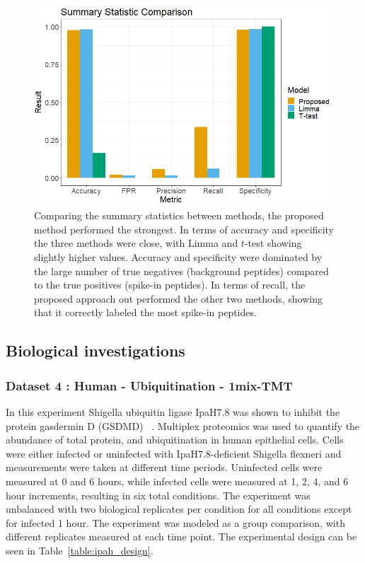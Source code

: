 \documentclass{mcp}
\begin{document}
\begin{figure}[h!]
\centering
\includegraphics[width=.85\textwidth]{sim_new/spike_in_statistic_comparison}
\caption{Comparing the summary statistics between methods, the proposed method performed the strongest. In terms of accuracy and specificity the three methods were close, with Limma and $t$-test showing slightly higher values. Accuracy and specificity were dominated by the large number of true negatives (background peptides) compared to the true positives (spike-in peptides). In terms of recall, the proposed approach out performed the other two methods, showing that it correctly labeled the most spike-in peptides. \label{fig:spike_stat}}
\end{figure}

\clearpage
\subsection{Biological investigations}
\label{sec:bio_investigations}

\subsubsection{Dataset 4 : Human - Ubiquitination - 1mix-TMT}
\label{sec:ipah}

In this experiment Shigella ubiquitin ligase IpaH7.8 was shown to inhibit the protein gasdermin D (GSDMD) ~\cite{LUCHETTI2021}. Multiplex proteomics was used to quantify the abundance of total protein, and ubiquitination in human epithelial cells. Cells were either infected or uninfected with IpaH7.8-deficient Shigella flexneri and measurements were taken at different time periods. Uninfected cells were measured at 0 and 6 hours, while infected cells were measured at 1, 2, 4, and 6 hour increments, resulting in six total conditions. The experiment was unbalanced with two biological replicates per condition for all conditions except for infected 1 hour. The experiment was modeled as a group comparison, with different replicates measured at each time point. The experimental design can be seen in Table~\ref{table:ipah_design}.
\end{document}
